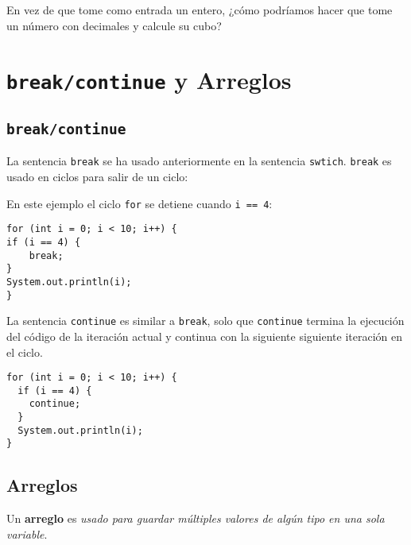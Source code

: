 \documentclass[12pt]{article}
\theoremstyle{largebreak}
\begin{document}
    \begin{excer}
        En vez de que tome como entrada un entero, ¿cómo podríamos hacer que tome un número con decimales y calcule su cubo?
    \end{excer}

    \section{\lstinline|break/continue| y Arreglos}

    \subsection{\lstinline|break/continue|}
    
    La sentencia \lstinline|break| se ha usado anteriormente en la sentencia \lstinline|swtich|. \lstinline|break| es usado en ciclos para salir de un ciclo:

    \begin{exa}
        En este ejemplo el ciclo \lstinline|for| se detiene cuando \lstinline|i == 4|:
        \begin{lstlisting}[caption={Programa que sale de un ciclo \lstinline|for| al llegar al \lstinline|4|.},label=DescriptiveLabel]
for (int i = 0; i < 10; i++) {
if (i == 4) {
    break;
}
System.out.println(i);
}
        \end{lstlisting}
    \end{exa}

    La sentencia \lstinline|continue| es similar a \lstinline|break|, solo que \lstinline|continue| termina la ejecución del código de la iteración actual y continua con la siguiente siguiente iteración en el ciclo.

    \begin{exa}
        \begin{lstlisting}[caption={Programa usando el ciclo \lstinline|for| que no imprime \lstinline|4|.},label=DescriptiveLabel]
for (int i = 0; i < 10; i++) {
  if (i == 4) {
    continue;
  }
  System.out.println(i);
}
        \end{lstlisting}
    \end{exa}

    \subsection{Arreglos}

    \begin{mydef}
        Un \textbf{arreglo} es \textit{usado para guardar múltiples valores de algún tipo en una sola variable}.
    \end{mydef}
\end{document}

